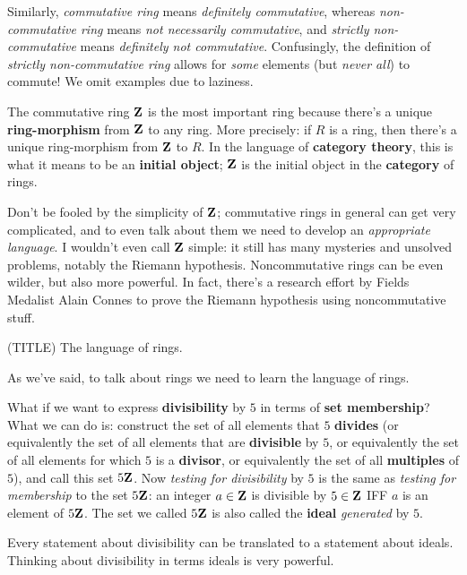Similarly, {\it commutative ring} means {\it definitely commutative}, whereas {\it non-commutative ring} means {\it not necessarily commutative}, and {\it strictly non-commutative} means {\it definitely not commutative}. Confusingly, the definition of {\it strictly non-commutative ring} allows for {\it some} elements (but {\it never all}) to commute! We omit examples due to laziness.

\vskip8pt
The commutative ring ${ \bf Z }$ is the most important ring because there's a unique {\bf ring-morphism} from ${ \bf Z }$ to any ring. More precisely: if $R$ is a ring, then there's a unique ring-morphism from ${ \bf Z }$ to $R$. In the language of {\bf category theory}, this is what it means to be an {\bf initial object}; ${ \bf Z }$ is the initial object in the {\bf category} of rings.

\vskip8pt
Don't be fooled by the simplicity of ${ \bf Z }$; commutative rings in general can get very complicated, and to even talk about them we need to develop an {\it appropriate language}. I wouldn't even call ${ \bf Z }$ simple: it still has many mysteries and unsolved problems, notably the Riemann hypothesis. Noncommutative rings can be even wilder, but also more powerful. In fact, there's a research effort by Fields Medalist Alain Connes to prove the Riemann hypothesis using noncommutative stuff.

\vskip8pt
(TITLE) The language of rings.

As we've said, to talk about rings we need to learn the language of rings.

\vskip8pt
What if we want to express {\bf divisibility} by $5$ in terms of {\bf set membership}? What we can do is: construct the set of all elements that $5$ {\bf divides} (or equivalently the set of all elements that are {\bf divisible} by $5$, or equivalently the set of all elements for which $5$ is a {\bf divisor}, or equivalently the set of all {\bf multiples} of $5$), and call this set $5 { \bf Z }$. Now {\it testing for divisibility} by $5$ is the same as {\it testing for membership} to the set $5 { \bf Z }$: an integer $a \in {  \bf Z }$ is divisible by $5 \in {  \bf Z }$ IFF $a$ is an element of $5 { \bf Z }$. The set we called $5 { \bf Z }$ is also called the {\bf ideal} {\it generated} by $5$.

Every statement about divisibility can be translated to a statement about ideals. Thinking about divisibility in terms ideals is very powerful.

